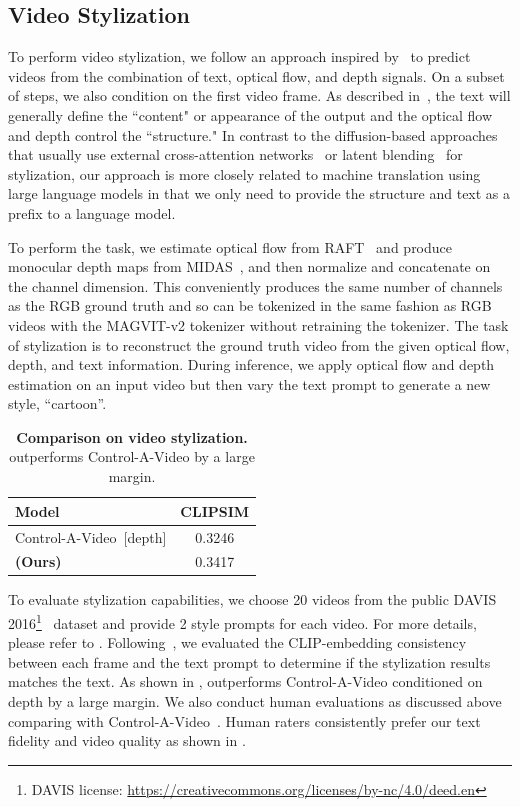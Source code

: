 \subsection{Video Stylization}
\label{sec:stylization}
To perform video stylization, we follow an approach inspired by~\cite{zhang2023adding,chen2023control,esser2023structure} to predict videos from the combination of text, optical flow, and depth signals. On a subset of steps, we also condition on the first video frame. As described in~\cite{esser2023structure}, the text will generally define the ``content" or appearance of the output and the optical flow and depth control the ``structure." In contrast to the diffusion-based approaches that usually use external cross-attention networks~\cite{zhang2023adding} or latent blending~\cite{meng2021sdedit} for stylization, our approach is more closely related to machine translation using large language models in that we only need to provide the structure and text as a prefix to a language model. 

To perform the task, we estimate optical flow from RAFT~\cite{sun2022disentangling} and produce monocular depth maps from MIDAS~\cite{ranftl2020midas}, and then normalize and concatenate on the channel dimension. This conveniently produces the same number of channels as the RGB ground truth and so can be tokenized in the same fashion as RGB videos with the MAGVIT-v2 tokenizer without retraining the tokenizer. The task of stylization is to reconstruct the ground truth video from the given optical flow, depth, and text information.
During inference, we apply optical flow and depth estimation on an input video but then vary the text prompt to generate a new style, \eg ``cartoon''.


\begin{table}[h]
\centering
\caption{\textbf{Comparison on video stylization.} \modelname{} outperforms Control-A-Video by a large margin. 
\label{table:stylization}
}
\begin{tabular}{lc}
\toprule
Model & CLIPSIM \\
\midrule
Control-A-Video~\cite{chen2023control}[depth] & 0.3246 \\
\textbf{\modelname{} (Ours)} & 0.3417 \\
\bottomrule
\end{tabular}
\end{table}

To evaluate stylization capabilities, we choose 20 videos from the public DAVIS 2016\footnote{DAVIS license: \url{https://creativecommons.org/licenses/by-nc/4.0/deed.en}}~\cite{Perazzi2016davis} dataset and provide 2 style prompts for each video. For more details, please refer to . Following~\cite{esser2023structure},
we evaluated the CLIP-embedding consistency between each frame and the text prompt
to determine if the stylization results matches the text. As shown in , \modelname{} outperforms Control-A-Video conditioned on depth by a large margin. We also conduct human evaluations as discussed above comparing with Control-A-Video~\cite{chen2023control}.
Human raters consistently 
prefer our text fidelity and video quality as shown in .


